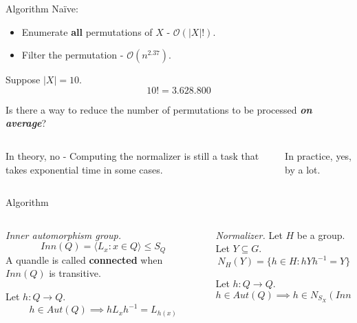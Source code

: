 \begin{frame}{Algorithm}
Naïve:
 \begin{itemize}
     \item Enumerate \textbf{all} permutations of $X$ - $\mathcal{O}(|X|!)$.
     \item Filter the permutation - $\mathcal{O}(n^{2.37})$. 
 \end{itemize}
 \begin{example}
        Suppose $\mid X \mid = 10$. 
        \[10! = 3.628.800\]
        
     \end{example}
\begin{center}
     Is there a way to reduce the number of permutations to be processed \newline \emph{\textbf{on average}}?
\end{center}
\begin{columns}
\begin{column}{0.5\textwidth}
\begin{center}
    In theory, no - Computing the normalizer is still a task that takes exponential time in some cases. 
\end{center}
\end{column}
\begin{column}{0.5\textwidth}
\begin{center}
    In practice, yes, by a lot.
\end{center}
\end{column}
\end{columns}
\end{frame}


\begin{frame}{Algorithm}
\begin{columns}
\begin{column}{0.45\textwidth}
\small
\begin{definition}
\emph{Inner automorphism group.}
\[Inn(Q) = \langle L_x : x \in Q \rangle \leq S_Q\]
A quandle is called \textbf{connected} when $Inn(Q)$ is transitive.
\end{definition}
\begin{lemma}
Let $h : Q \to Q$.
\[h \in Aut(Q) \implies hL_xh^{-1} = L_{h(x)}\]
\end{lemma}
\end{column}
\begin{column}{0.5\textwidth}
\small\begin{definition}
\emph{Normalizer.}\newline
Let $H$ be a group.\newline
Let $Y \subseteq G$.
\[N_H(Y) = \{ h \in H : hYh^{-1} = Y\}\]
\end{definition}
\begin{theorem}
Let $h : Q \to Q$.
\[h \in Aut(Q) \implies h \in N_{S_X}(Inn(Q))\]
\end{theorem}
\end{column}
\end{columns}
\begin{center}
    \textcolor{darkred}{} 
\end{center}
\end{frame}


